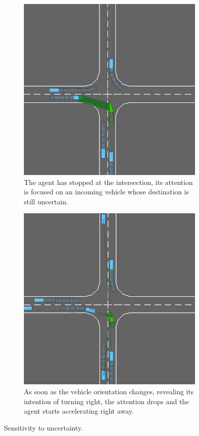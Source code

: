 \begin{figure}[tp]
	\centering
	\begin{subfigure}[t]{0.4\linewidth}
		\includegraphics[width=\linewidth]{img/watch1}
		\caption{The agent has stopped at the intersection, its attention is focused on an incoming vehicle whose destination is still uncertain.}
	\end{subfigure}
	\begin{subfigure}[t]{0.4\linewidth}
		\includegraphics[width=\linewidth]{img/watch2}
		\caption{As soon as the vehicle orientation changes, revealing its intention of turning right, the attention drops and the agent starts accelerating right away.}
	\end{subfigure}
	\caption{Sensitivity to uncertainty.}
	\label{fig:sensitivity}
\end{figure}

